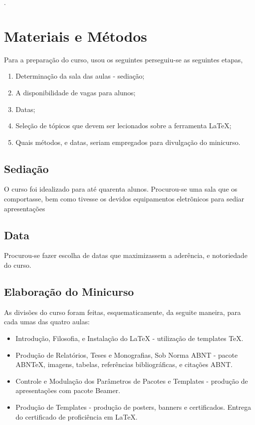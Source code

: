 \documentclass[
	12pt,				%
	openright,			%
	oneside,			%
	a4paper,			%
	english,			%
	french,				%
	spanish,			%
	brazil,				%
	]{abntex2}
\begin{document}
 \cite{baramidze2014} \cite{hwang1995}.

\chapter{Materiais e Métodos}

Para a preparação do curso, usou os seguintes perseguiu-se as
seguintes etapas,

\begin{enumerate}
\item Determinação da sala das aulas - sediação;
\item A disponibilidade de vagas para alunos;
\item Datas;
\item Seleção de tópicos que devem ser lecionados sobre a ferramenta
  \LaTeX;
\item Quais métodos, e datas, seriam empregados para divulgação do minicurso.
\end{enumerate}

\section{Sediação}
O curso foi idealizado para até quarenta alunos. Procurou-se uma sala
que os comportasse, bem como tivesse os devidos equipamentos
eletrõnicos para sediar apresentações



\section{Data}
Procurou-se fazer escolha de datas que maximizassem a aderência, e
notoriedade do curso.


\section{Elaboração do Minicurso}

As divisões do curso foram feitas, esquematicamente, da seguite maneira, para cada umas
das quatro aulas:

\begin{itemize}
\item Introdução, Filosofia, e Instalação do LaTeX - utilização de templates TeX.
\item Produção de Relatórios, Teses e Monografias, Sob Norma ABNT -
  pacote ABNTeX, imagens, tabelas, referências bibliográficas, e
  citações ABNT.
\item Controle e Modulação dos Parâmetros de Pacotes e Templates - produção de apresentações com pacote Beamer.
\item Produção de Templates - produção de posters, banners e certificados.  Entrega do certificado de proficiência em LaTeX.
\end{itemize}
\end{document}
